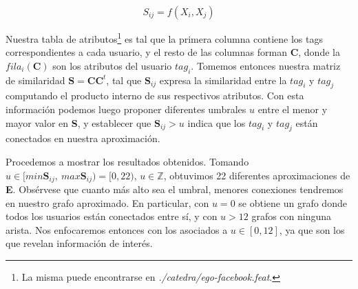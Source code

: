 \begin{equation}
    S_{ij} = f(X_i, X_j)
\end{equation}

Nuestra tabla de atributos\footnote{La misma puede encontrarse en \textit{./catedra/ego-facebook.feat}.} es tal que la primera columna contiene los tags correspondientes a cada usuario, y el resto de las columnas forman \textbf{C}, donde la $fila_i(\textbf{C})$ son los atributos del usuario $tag_i$. Tomemos entonces nuestra matriz de similaridad $\textbf{S} = \textbf{CC}^{t}$, tal que $\textbf{S}_{ij}$ expresa la similaridad entre la $tag_{i}$ y $tag_{j}$ computando el producto interno de sus respectivos atributos. Con esta información podemos luego proponer diferentes umbrales $u$ entre el menor y mayor valor en \textbf{S}, y establecer que $\textbf{S}_{ij} > u$ indica que los $tag_{i}$ y $tag_{j}$ están conectados en nuestra aproximación. 

Procedemos a mostrar los resultados obtenidos. Tomando $u \in [min{\textbf{S}_{ij}},\ max{\textbf{S}_{ij}}) = [0, 22)$, $u \in \mathbb{Z}$, obtuvimos 22 diferentes aproximaciones de \textbf{E}.
Obsérvese que cuanto más alto sea el umbral, menores conexiones tendremos en nuestro grafo aproximado. En particular, con $u = 0$ se obtiene un grafo donde todos los usuarios están conectados entre sí, y con $u > 12$ grafos con ninguna arista. Nos enfocaremos entonces con los asociados a $u \in [0, 12]$, ya que son los que revelan información de interés.

\vspace{1em}


